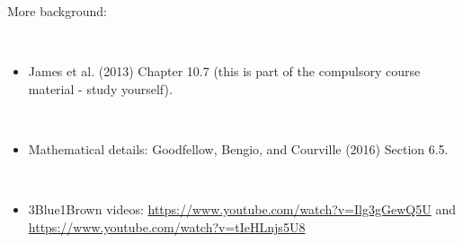 \documentclass[
  10pt,
  ignorenonframetext,
  twocolumn]{beamer}
\providecommand{\tightlist}{%
  \setlength{\itemsep}{0pt}\setlength{\parskip}{0pt}}
\begin{document}
\begin{frame}
More background:

\(~\)

\begin{itemize}
\tightlist
\item
  James et al. (2013) Chapter 10.7 (this is part of the compulsory
  course material - study yourself).
\end{itemize}

\(~\)

\begin{itemize}
\tightlist
\item
  Mathematical details: Goodfellow, Bengio, and Courville (2016) Section
  6.5.\\
\end{itemize}

\(~\)

\begin{itemize}
\tightlist
\item
  3Blue1Brown videos: \url{https://www.youtube.com/watch?v=Ilg3gGewQ5U}
  and \url{https://www.youtube.com/watch?v=tIeHLnjs5U8}
\end{itemize}
\end{frame}
\end{document}
